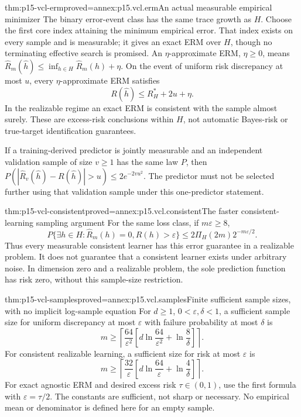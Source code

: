 \begin{hbtheorem}{thm:p15-vcl-erm}{proved=annex:p15.vcl.erm}{An actual measurable empirical minimizer}
The binary error-event class has the same trace growth as \(H\).
Choose the first core index attaining the minimum empirical error.
That index exists on every sample and is measurable; it gives an exact
ERM over \(H\), though no terminating effective search is promised.
An \(\eta\)-approximate ERM, \(\eta\geq0\), means
\(\widehat R_m(\widehat h)\leq\inf_{h\in H}\widehat R_m(h)+\eta\).
On the event of uniform risk discrepancy at most \(u\), every
\(\eta\)-approximate ERM satisfies
\[
 R(\widehat h)\leq R_H^*+2u+\eta.
\]
In the realizable regime an exact ERM is consistent with the sample almost
surely. These are excess-risk conclusions within \(H\), not automatic
Bayes-risk or true-target identification guarantees.

If a training-derived predictor is jointly measurable and an independent
validation sample of size \(v\geq1\) has the same law \(P\), then
\(P(|\widehat R_v(\widehat h)-R(\widehat h)|>u)\leq2e^{-2vu^2}\).
The predictor must not be selected further using that validation sample
under this one-predictor statement.
\end{hbtheorem}

\begin{hbtheorem}{thm:p15-vcl-consistent}{proved=annex:p15.vcl.consistent}{The faster consistent-learning sampling argument}
For the same loss class, if \(m\varepsilon\geq8\),
\[
 P\{\exists h\in H:\widehat R_m(h)=0, R(h)>\varepsilon\}
 \leq2\Pi_H(2m)2^{-m\varepsilon/2}.
\]
Thus every measurable consistent learner has this error guarantee in a
realizable problem. It does not guarantee that a consistent learner exists
under arbitrary noise. In dimension zero and a realizable problem, the
sole prediction function has risk zero, without this sample-size restriction.
\end{hbtheorem}

\begin{hbcorollary}{thm:p15-vcl-samples}{proved=annex:p15.vcl.samples}{Finite sufficient sample sizes, with no implicit log-sample equation}
For \(d\geq1\), \(0<\varepsilon,\delta<1\), a sufficient sample size
for uniform discrepancy at most \(\varepsilon\) with failure probability
at most \(\delta\) is
\[
 m\geq\left\lceil\frac{64}{\varepsilon^2}
       \left[d\ln\frac{64}{\varepsilon^2}+\ln\frac8\delta\right]\right\rceil.
\]
For consistent realizable learning, a sufficient size for risk at most
\(\varepsilon\) is
\[
 m\geq\left\lceil\frac{32}{\varepsilon}
       \left[d\ln\frac{64}{\varepsilon}+\ln\frac4\delta\right]\right\rceil.
\]
For exact agnostic ERM and desired excess risk \(\tau\in(0,1)\), use
the first formula with \(\varepsilon=\tau/2\). The constants are
sufficient, not sharp or necessary. No empirical mean or denominator is
defined here for an empty sample.
\end{hbcorollary}

